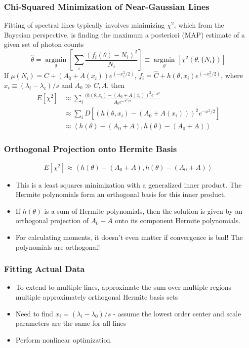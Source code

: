 \documentclass{beamer}
\begin{document}
\begin{frame}
	\frametitle{Chi-Squared Minimization of Near-Gaussian Lines}
	Fitting of spectral lines typically involves minimizing \(\chi^2\), which from the Bayesian perspective, is finding the maximum a posteriori (MAP) estimate of a given set of photon counts
	\begin{equation}
	\hat{\theta} = \underset{\theta}{\operatorname{argmin}} \left[\sum_{i} \frac{(f_i(\theta) - N_i)^2}{N_i}\right] \equiv \underset{\theta}{\operatorname{argmin}} \left[\chi^2(\theta, \{N_i\})\right]
	\end{equation}
	If \(\mu(N_i) = C + (A_0+A(x_i))e^(-x_i^2/2) \), \(f_i = \hat{C} + h(\theta, x_i) e^(-x_i^2/2)\), where \(x_i \equiv (\lambda_i - \lambda_c)/s\) and \(A_0\gg C, A\), then
	\begin{align}
	E[\chi^2] &\approx \sum_{i} \frac{(h(\theta, x_i) - (A_0 + A(x_i))^2 e^{-x^2}}{A_0 e^{-x^2/2}} \\
	&\approx \sum_{i} D \left[(h(\theta, x_i) - (A_0 + A(x_i)))^2 e^{-x^2/2}\right] \\
	&\approx \left<h(\theta) - (A_0 + A), h(\theta)-(A_0 + A) \right>
	\end{align}
\end{frame}

\begin{frame}
	\frametitle{Orthogonal Projection onto Hermite Basis}
	\begin{equation}
	E[\chi^2] \approx \left<h(\theta) - (A_0 + A), h(\theta)-(A_0 + A) \right>
	\end{equation}
	\begin{itemize}
		\item This is a least squares minimization with a generalized inner product. The Hermite polynomials form an orthogonal basis for this inner product.
		\item If \(h(\theta)\) is a sum of Hermite polynomials, then the solution is given by an orthogonal projection of \(A_0 + A\) onto its component Hermite polynomials.
		\item For calculating moments, it doesn't even matter if convergence is bad! The polynomials are orthogonal!
	\end{itemize}
\end{frame}

\begin{frame}
	\frametitle{Fitting Actual Data}
	\begin{itemize}
		\item To extend to multiple lines, approximate the sum over multiple regions - multiple approximately orthogonal Hermite basis sets
		\item Need to find \(x_i = (\lambda_i - \lambda_0)/s\) - assume the lowest order center and scale parameters are the same for all lines
		\item Perform nonlinear optimization
	\end{itemize}
\end{frame}
\end{document}
